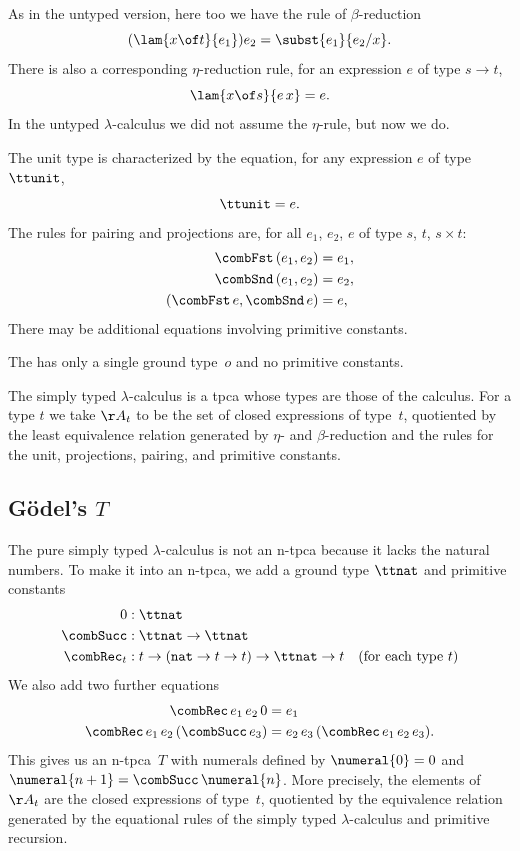 As in the untyped version, here too we have the rule of
$\beta$-reduction
%
\begin{equation*}
  (\lam{x \of t}{e_1}) e_2 = \subst{e_1}{e_2/x}.
\end{equation*}
%
There is also a corresponding $\eta$-reduction rule, for an expression
$e$ of type $s \to t$,
%
\begin{equation*}
  \lam{x \of s}{e\,x} = e.
\end{equation*}
%
In the untyped $\lambda$-calculus we did not assume the $\eta$-rule,
but now we do.

The unit type is characterized by the equation, for any expression $e$
of type $\ttunit$,
%
\begin{equation*}
  \ttunit = e.
\end{equation*}
%
The rules for pairing and projections are, for all $e_1$, $e_2$, $e$
of type $s$, $t$, $s \times t$:
%
\begin{align*}
  \combFst\,(e_1, e_2) &= e_1,
  \\
  \combSnd\,(e_1, e_2) &= e_2,
  \\
  (\combFst\,e, \combSnd\,e) &= e,
\end{align*}
%
There may be additional equations involving primitive constants.

The  has only a single ground
type~$o$ and no primitive constants.

The simply typed $\lambda$-calculus is a tpca whose types are those of the
calculus. For a type $t$ we take $\AA_t$ to be the set of closed
expressions of type~$t$, quotiented by the least equivalence relation
generated by $\eta$- and $\beta$-reduction and the rules for the unit,
projections, pairing, and primitive constants.

\subsection[\texorpdfstring{Gödel's $T$}{Gödel's T}]{Gödel's $T$}

The pure simply typed $\lambda$-calculus is not an n-tpca because it lacks the
natural numbers. To make it into an n-tpca, we
add a ground type $\ttnat$ and primitive constants
%
\begin{align*}
  0 &: \ttnat \\
  \combSucc  &: \ttnat \to \ttnat \\
  \combRec_t &: t \to (\mathtt{nat} \to t \to t) \to \ttnat \to t
  \quad\text{(for each type $t$)}
\end{align*}
%
We also add two further equations
%
\begin{align*}
  \combRec \, e_1 \, e_2 \, 0 &= e_1
  \\
  \combRec \, e_1 \, e_2 \, (\combSucc \, e_3) &=
  e_2 \, e_3 \, (\combRec \, e_1 \, e_2 \, e_3).
\end{align*}
%
This gives us an n-tpca~$T$ with numerals defined by $\numeral{0} = 0$
and $\numeral{n+1} = \combSucc \, \numeral{n}$. More precisely, the
elements of $\AA_t$ are the closed expressions of type~$t$, quotiented by
the equivalence relation generated by the equational rules of the simply typed
$\lambda$-calculus and primitive recursion.

